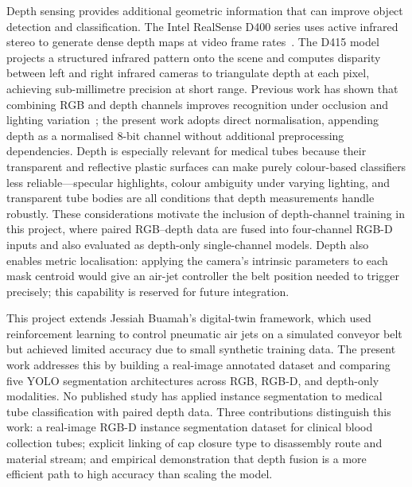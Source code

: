 \documentclass{Academic}
\begin{document}
Depth sensing provides additional geometric information that can improve object detection and classification. The Intel RealSense D400 series uses active infrared stereo to generate dense depth maps at video frame rates~\supercite{keselman2017realsense}. The D415 model projects a structured infrared pattern onto the scene and computes disparity between left and right infrared cameras to triangulate depth at each pixel, achieving sub-millimetre precision at short range. Previous work has shown that combining RGB and depth channels improves recognition under occlusion and lighting variation~\supercite{eitel2015rgbd}; the present work adopts direct normalisation, appending depth as a normalised 8-bit channel without additional preprocessing dependencies. Depth is especially relevant for medical tubes because their transparent and reflective plastic surfaces can make purely colour-based classifiers less reliable---specular highlights, colour ambiguity under varying lighting, and transparent tube bodies are all conditions that depth measurements handle robustly. These considerations motivate the inclusion of depth-channel training in this project, where paired RGB--depth data are fused into four-channel RGB-D inputs and also evaluated as depth-only single-channel models. Depth also enables metric localisation: applying the camera's intrinsic parameters to each mask centroid would give an air-jet controller the belt position needed to trigger precisely; this capability is reserved for future integration.

This project extends Jessiah Buamah's digital-twin framework, which used reinforcement learning to control pneumatic air jets on a simulated conveyor belt but achieved limited accuracy due to small synthetic training data. The present work addresses this by building a real-image annotated dataset and comparing five YOLO segmentation architectures across RGB, RGB-D, and depth-only modalities. No published study has applied instance segmentation to medical tube classification with paired depth data. Three contributions distinguish this work: a real-image RGB-D instance segmentation dataset for clinical blood collection tubes; explicit linking of cap closure type to disassembly route and material stream; and empirical demonstration that depth fusion is a more efficient path to high accuracy than scaling the model.
\end{document}
